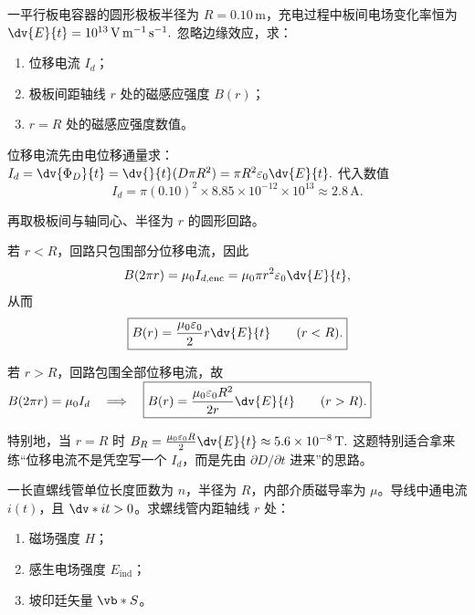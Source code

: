 \documentclass[lang=cn,11pt]{elegantbook}
\begin{document}
\begin{exercise}
一平行板电容器的圆形极板半径为 \(R=0.10\,\mathrm{m}\)，充电过程中板间电场变化率恒为
 \(\dv{E}{t}=10^{13}\,\mathrm{V\,m^{-1}\,s^{-1}}.\) 
忽略边缘效应，求：
\begin{enumerate}
 \item 位移电流 \(I_d\)；
 \item 极板间距轴线 \(r\) 处的磁感应强度 \(B(r)\)；
 \item \(r=R\) 处的磁感应强度数值。
\end{enumerate}
\end{exercise}

\begin{solution}
位移电流先由电位移通量求：
 \(I_d=\dv{\Phi_D}{t}=\dv{}{t}(D\pi R^2) =\pi R^2\varepsilon_0\dv{E}{t}.\) 
代入数值
\[
I_d=\pi(0.10)^2\times 8.85\times 10^{-12}\times 10^{13}
\approx 2.8\,\mathrm{A}.
\]

再取极板间与轴同心、半径为 \(r\) 的圆形回路。

若 \(r<R\)，回路只包围部分位移电流，因此
\[
B(2\pi r)=\mu_0 I_{d,\mathrm{enc}}
=\mu_0\pi r^2\varepsilon_0\dv{E}{t},
\]
从而
\[
\boxed{
B(r)=\frac{\mu_0\varepsilon_0}{2}r\dv{E}{t}
\qquad (r<R).
}
\]

若 \(r>R\)，回路包围全部位移电流，故
 \(B(2\pi r)=\mu_0I_d \quad\Longrightarrow\quad \boxed{ B(r)=\frac{\mu_0\varepsilon_0R^2}{2r}\dv{E}{t} \qquad (r>R). }\) 

特别地，当 \(r=R\) 时
 \(B_R=\frac{\mu_0\varepsilon_0R}{2}\dv{E}{t} \approx 5.6\times 10^{-8}\,\mathrm{T}.\) 
这题特别适合拿来练“位移电流不是凭空写一个 \(I_d\)，而是先由 \(\partial D/\partial t\) 进来”的思路。
\end{solution}

\begin{exercise}[电流随时间变化的螺线管内的感生电场与坡印廷矢量]
一长直螺线管单位长度匝数为 \(n\)，半径为 \(R\)，内部介质磁导率为 \(\mu\)。导线中通电流 \(i(t)\)，且 \(\dv*{i}{t}>0\)。求螺线管内距轴线 \(r\) 处：
\begin{enumerate}
 \item 磁场强度 \(H\)；
 \item 感生电场强度 \(E_{\mathrm{ind}}\)；
 \item 坡印廷矢量 \(\vb*{S}\)。
\end{enumerate}
\end{exercise}
\end{document}
